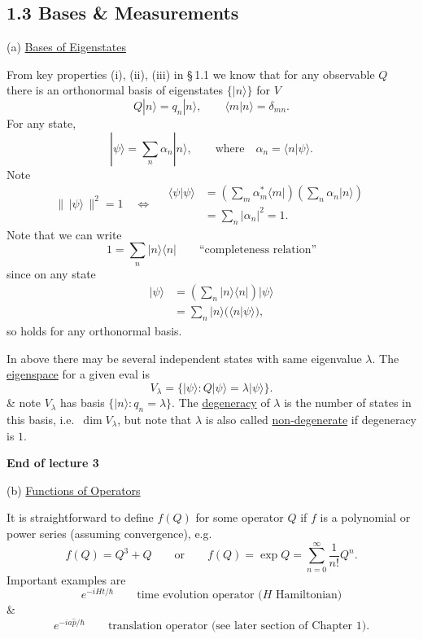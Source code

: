 \documentclass[11pt,a4paper]{article}
\begin{document}
\subsection*{1.3 Bases \& Measurements}

\noindent
(a) \underline{Bases of Eigenstates}

From key properties (i), (ii), (iii) in \S\,1.1 we know that
for any observable $Q$ there is an orthonormal basis of eigenstates
$\{|n\rangle\}$ for $V$
\[
    Q|n\rangle=q_n|n\rangle,
    \qquad
    \langle m|n\rangle=\delta_{mn}.
\]
For any state,
\[
    |\psi\rangle=\sum_n\alpha_n|n\rangle,
    \qquad\text{where}\quad
    \alpha_n=\langle n|\psi\rangle.
\]
Note
\[
    \bigl\|\,|\psi\rangle\,\bigr\|^2=1
    \quad\Longleftrightarrow\quad
    \begin{aligned}
        \langle\psi|\psi\rangle
        &=\left(\sum_m\alpha_m^*\langle m|\right)
        \left(\sum_n\alpha_n|n\rangle\right)\\
        &=\sum_n|\alpha_n|^2=1.
    \end{aligned}
\]
Note that we can write
\[
    1=\sum_n|n\rangle\langle n|
    \qquad\text{``completeness relation''}
\]
since on any state
\begin{align*}
    |\psi\rangle
    &=\left(\sum_n|n\rangle\langle n|\right)|\psi\rangle\\
    &=\sum_n|n\rangle\bigl(\langle n|\psi\rangle\bigr),
\end{align*}
so holds for any orthonormal basis.

In above there may be several independent states with same eigenvalue $\lambda$.
The \underline{eigenspace} for a given eval is
\[
    V_\lambda=\bigl\{|\psi\rangle:Q|\psi\rangle=\lambda|\psi\rangle\bigr\}.
\]
\& note $V_\lambda$ has basis $\bigl\{|n\rangle:q_n=\lambda\bigr\}$.
The \underline{degeneracy} of $\lambda$ is the number of states in this basis,
i.e.\ $\dim V_\lambda$, but note that $\lambda$ is also called
\underline{non-degenerate} if degeneracy is $1$.

\begin{center}
    \textbf{End of lecture 3}
\end{center}

\noindent
(b) \underline{Functions of Operators}

It is straightforward to define $f(Q)$ for some operator $Q$
if $f$ is a polynomial or power series (assuming convergence), e.g.
\[
    f(Q)=Q^3+Q
    \qquad\text{or}\qquad
    f(Q)=\exp Q=\sum_{n=0}^{\infty}\frac{1}{n!}Q^n.
\]
Important examples are
\[
    e^{-iHt/\hbar}
    \qquad\text{time evolution operator ($H$ Hamiltonian)}
\]
\&
\[
    e^{-ia\hat{p}/\hbar}
    \qquad\text{translation operator (see later section of Chapter 1).}
\]
\end{document}
